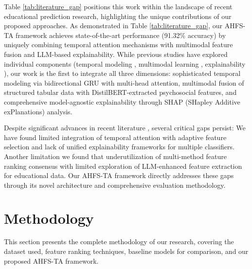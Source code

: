 \documentclass[journal]{IEEEtran}
\begin{document}
Table \ref{tab:literature_gap} positions this work within the landscape of recent educational prediction research, highlighting the unique contributions of our proposed approaches.
As demonstrated in Table \ref{tab:literature_gap}, our AHFS-TA framework achieves state-of-the-art performance (91.32\% accuracy) by uniquely combining temporal attention mechanisms with multimodal feature fusion and LLM-based explainability. While previous studies have explored individual components (temporal modeling \cite{niu2023pmct,sivakarthi2024predicting}, multimodal learning \cite{van2025student,kayande2025design}, explainability \cite{mustofa2025novel,goran2024identifying}), our work is the first to integrate all three dimensions: sophisticated temporal modeling via bidirectional GRU with multi-head attention, multimodal fusion of structured tabular data with DistilBERT-extracted psychosocial features, and comprehensive model-agnostic explainability through SHAP (SHapley Additive exPlanations) analysis.

Despite significant advances in recent literature \cite{mustofa2025novel,radhakrishnan2025narx_cnn,kruger2023explainable}, several critical gaps persist:
We have found limited integration of temporal attention with adaptive feature selection and lack of unified explainability frameworks for multiple classifiers. Another limitation we found that underutilization of multi-method feature ranking consensus
with limited exploration of LLM-enhanced feature extraction for educational data. Our AHFS-TA framework directly addresses these gaps through its novel architecture and comprehensive evaluation methodology.

\section{Methodology}

This section presents the complete methodology of our research, covering the dataset used, feature ranking techniques, baseline models for comparison, and our proposed AHFS-TA framework.
\end{document}
